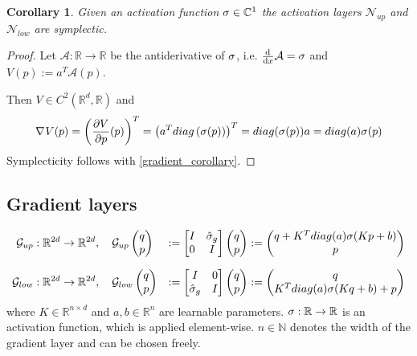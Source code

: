 \documentclass[twoside,a4paper]{article}
\newtheorem{corollary}{Corollary}
\begin{document}
\begin{corollary}
	Given an activation function $\sigma \in \mathbb{C}^1$
	the activation layers $\mathcal{N}_{up}$ and $\mathcal{N}_{low}$ are symplectic.
\end{corollary}
\begin{proof}
	Let $\mathcal{A}: \mathbb{R} \to \mathbb{R}$ be the antiderivative of $\sigma$, 
	i.e. $\frac{\mathrm{d}^{}}{\mathrm{d}x} \mathcal{A} = \sigma$ and $V(p) := a^T\mathcal{A}(p)$.

	Then $V \in C^2(\mathbb{R}^d, \mathbb{R})$ and
	\begin{equation*}
		\nabla_{}{V}(p) = \left(\frac{\partial V}{\partial p}(p)\right)^T = \left( a^Tdiag\left(\sigma(p)\right)\right)^T
		= diag(\sigma(p)) a
		= diag(a) \sigma(p)
	\end{equation*}
	Symplecticity follows with \cref{gradient_corollary}.
\end{proof}

\subsection{Gradient layers}

\begin{alignat*}{2}
	\mathcal{G}_{up} &: \mathbb{R}^{2d} \to \mathbb{R}^{2d}, \quad
	\mathcal{G}_{up} \begin{pmatrix} q \\ p \end{pmatrix} &:= \begin{bmatrix} I & {\hat{\sigma}_g} \\ 0 & I \end{bmatrix} \begin{pmatrix} q \\ p \end{pmatrix} := \begin{pmatrix}
		q + K^T diag(a) \sigma(Kp + b) \\
		p
	\end{pmatrix} \\[7pt]
	\mathcal{G}_{low} &: \mathbb{R}^{2d} \to \mathbb{R}^{2d}, \quad
	\mathcal{G}_{low} \begin{pmatrix} q \\ p \end{pmatrix} &:= \begin{bmatrix} I & 0 \\ {\hat{\sigma}_g} & I \end{bmatrix} \begin{pmatrix} q \\ p \end{pmatrix} := \begin{pmatrix}
		q \\
		K^T diag(a) \sigma(Kq + b) + p
	\end{pmatrix}
\end{alignat*}
where $K \in \mathbb{R}^{n \times d}$ and $a,b \in \mathbb{R}^n$
are learnable parameters. $\sigma : \mathbb{R} \to \mathbb{R}$ 
is an activation function, which is applied element-wise.
$n \in \mathbb{N}$ denotes the width of the gradient layer and can be chosen freely.
\end{document}
